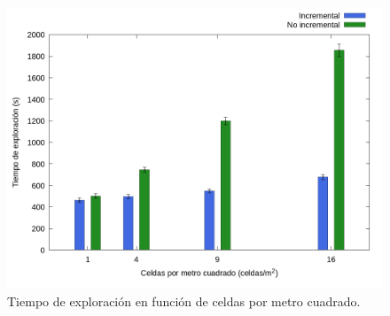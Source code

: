 



\begin{figure}[H]
  \centerfloat

  \includegraphics[clip=true, width=\graphlen]{imagenes/graficas_chicas/graficas_histo_num/incrementalidad/exploration_time.png}

  \caption{Tiempo de exploración en función de celdas por metro cuadrado.}\label{fig:gra:inc:et}

\end{figure}

